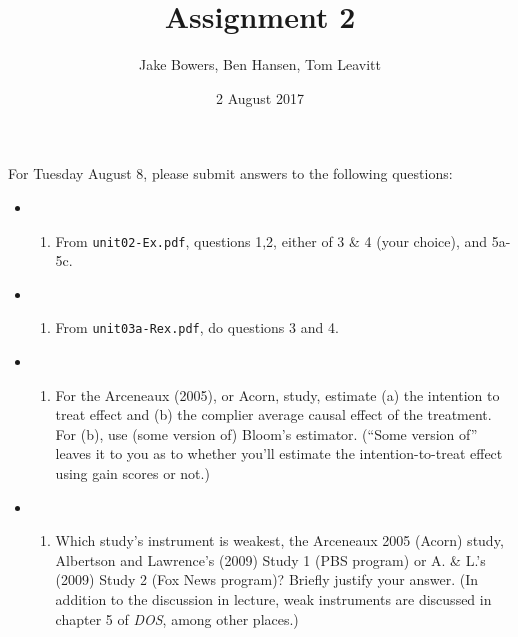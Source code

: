 \documentclass[11pt,]{article}
\title{Assignment 2}
\author{Jake Bowers, Ben Hansen, Tom Leavitt}
\date{2 August 2017}
\begin{document}
\maketitle

For Tuesday August 8, please submit answers to the following questions:

\begin{itemize}
\item
  \begin{enumerate}
  \def\labelenumi{(\Alph{enumi})}
  \itemsep1pt\parskip0pt
  \item
    From \texttt{unit02-Ex.pdf}, questions 1,2, either of 3 \& 4 (your
    choice), and 5a-5c.
  \end{enumerate}
\item
  \begin{enumerate}
  \def\labelenumi{(\Alph{enumi})}
  \setcounter{enumi}{1}
  \itemsep1pt\parskip0pt
  \item
    From \texttt{unit03a-Rex.pdf}, do questions 3 and 4.
  \end{enumerate}
\item
  \begin{enumerate}
  \def\labelenumi{(\Alph{enumi})}
  \setcounter{enumi}{2}
  \itemsep1pt\parskip0pt
  \item
    For the Arceneaux (2005), or Acorn, study, estimate (a) the
    intention to treat effect and (b) the complier average causal effect
    of the treatment. For (b), use (some version of) Bloom's estimator.
    (``Some version of'' leaves it to you as to whether you'll estimate
    the intention-to-treat effect using gain scores or not.)\\
  \end{enumerate}
\item
  \begin{enumerate}
  \def\labelenumi{(\Alph{enumi})}
  \setcounter{enumi}{3}
  \itemsep1pt\parskip0pt
  \item
    Which study's instrument is weakest, the Arceneaux 2005 (Acorn)
    study, Albertson and Lawrence's (2009) Study 1 (PBS program) or A.
    \& L.'s (2009) Study 2 (Fox News program)? Briefly justify your
    answer. (In addition to the discussion in lecture, weak instruments
    are discussed in chapter 5 of \emph{DOS}, among other places.)
  \end{enumerate}
\end{itemize}
\end{document}
